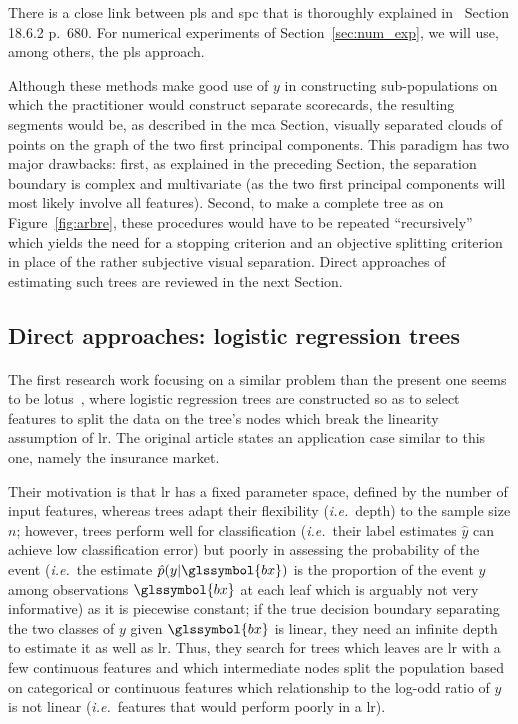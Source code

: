 There is a close link between \gls{pls} and \gls{spc} that is thoroughly explained in~\cite{friedman2001elements} Section 18.6.2 p.\ 680. For numerical experiments of Section~\ref{sec:num_exp}, we will use, among others, the \gls{pls} approach.

\medskip

Although these methods make good use of $y$ in constructing sub-populations on which the practitioner would construct separate scorecards, the resulting segments would be, as described in the \gls{mca} Section, visually separated clouds of points on the graph of the two first principal components. This paradigm has two major drawbacks: first, as explained in the preceding Section, the separation boundary is complex and multivariate (as the two first principal components will most likely involve all features). Second, to make a complete tree as on Figure~\ref{fig:arbre}, these procedures would have to be repeated ``recursively'' which yields the need for a stopping criterion and an objective splitting criterion in place of the rather subjective visual separation. Direct approaches of estimating such trees are reviewed in the next Section.

\subsection{Direct approaches: logistic regression trees} \label{subsec:direct}

\paragraph{}

The first research work focusing on a similar problem than the present one seems to be \gls{lotus}~\cite{chan2004lotus}, where logistic regression trees are constructed so as to select features to split the data on the tree's nodes which break the linearity assumption of \gls{lr}. The original article states an application case similar to this one, namely the insurance market.

Their motivation is that \gls{lr} has a fixed parameter space, defined by the number of input features, whereas trees adapt their flexibility (\textit{i.e.}\ depth) to the sample size $n$; however, trees perform well for classification (\textit{i.e.}\ their label estimates $\hat{y}$ can achieve low classification error) but poorly in assessing the probability of the event (\textit{i.e.}\ the estimate $\hat{p}(y | \glssymbol{bx})$ is the proportion of the event $y$ among observations $\glssymbol{bx}$ at each leaf which is arguably not very informative) as it is piecewise constant; if the true decision boundary separating the two classes of $y$ given $\glssymbol{bx}$ is linear, they need an infinite depth to estimate it as well as \gls{lr}. Thus, they search for trees which leaves are \gls{lr} with a few continuous features and which intermediate nodes split the population based on categorical or continuous features which relationship to the log-odd ratio of $y$ is not linear (\textit{i.e.}\ features that would perform poorly in a \gls{lr}).

